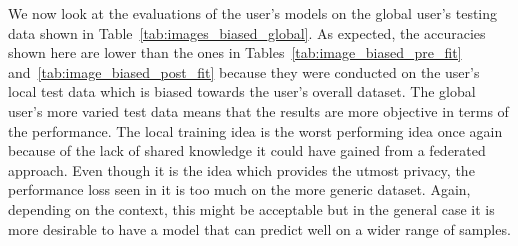 \documentclass[12pt]{article}
\begin{document}
\begin{table}[H]
\def\arraystretch{1.2}%

\caption{Image dataset: Results from testing user models on global user's data with $P = 0.7$}\label{tab:images_biased_global}
\end{table}
\noindent We now look at the evaluations of the user's models on the global user's testing data shown in Table~\ref{tab:images_biased_global}. As expected, the accuracies shown here are lower than the ones in Tables~\ref{tab:image_biased_pre_fit} and~\ref{tab:image_biased_post_fit} because they were conducted on the user's local test data which is biased towards the user's overall dataset. The global user's more varied test data means that the results are more objective in terms of the performance. The local training idea is the worst performing idea once again because of the lack of shared knowledge it could have gained from a federated approach. Even though it is the idea which provides the utmost privacy, the performance loss seen in it is too much on the more generic dataset. Again, depending on the context, this might be acceptable but in the general case it is more desirable to have a model that can predict well on a wider range of samples.
\end{document}
